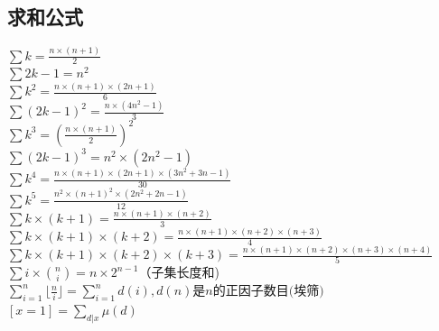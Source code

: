 	\subsection{求和公式}
	$\sum{k} = \frac{n\times (n+1)}{2}$\\
	$\sum{2k-1} = n^{2}$\\
	$\sum{k^{2}} = \frac{n\times (n+1)\times (2n+1)}{6}$\\
	$\sum{(2k-1)^{2}} = \frac{n\times (4n^{2}-1)}{3}$\\
	$\sum{k^{3}} = (\frac{n\times (n+1)}{2})^{2}$\\
	$\sum{(2k-1)^{3}} = n^{2}\times (2n^{2}-1)$\\
	$\sum{k^{4}} = \frac{n\times (n+1)\times (2n+1)\times (3n^{2}+3n-1)}{30}$\\
	$\sum{k^{5}} = \frac{n^{2}\times (n+1)^{2}\times (2n^{2}+2n-1)}{12}$\\
	$\sum{k\times (k+1)} = \frac{n\times (n+1)\times (n+2)}{3}$\\
	$\sum{k\times (k+1)\times (k+2)} = \frac{n\times (n+1)\times (n+2)\times (n+3)}{4}$\\
	$\sum{k\times (k+1)\times (k+2)\times (k+3)} = \frac{n\times (n+1)\times (n+2)\times (n+3)\times (n+4)}{5}$\\
	$\sum{i\times \binom{n}{i}} = n \times 2^{n - 1}$（子集长度和)\\
	$\sum_{i=1}^{n} \lfloor{\frac{n}{i}}\rfloor = \sum_{i=1}^{n} d(i), d(n)\text{是}n\text{的正因子数目(埃筛)}$\\
	$[x=1] = \sum_{d|x} \mu (d)$
